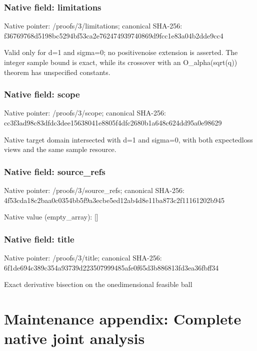 \documentclass[10pt,a4paper]{article}
\begin{document}
\subsubsection{Native field: limitations}


Native pointer: /proofs/3/limitations; canonical SHA-256: f36769768d5198bc5294bf53\allowbreak{}ca2e762474939740869d9fcc\allowbreak{}1e83a04b2dde9cc4


Valid only for d=1 and sigma=0; no positivenoise extension is asserted. The integer sample bound is exact, while its crossover with an O\_alpha(sqrt(q)) theorem has unspecified constants.


\subsubsection{Native field: scope}


Native pointer: /proofs/3/scope; canonical SHA-256: cc3f3ad98c83dfdc3dee1563\allowbreak{}8041e8805f4dfc2680b1a648\allowbreak{}c624dd95a0e98629


Native target domain intersected with d=1 and sigma=0, with both expectedloss views and the same sample resource.


\subsubsection{Native field: source\_refs}


Native pointer: /proofs/3/source\_refs; canonical SHA-256: 4f53cda18c2baa0c0354bb5f\allowbreak{}9a3ecbe5ed12ab4d8e11ba87\allowbreak{}3c2f11161202b945



Native value (empty\_array): []



\subsubsection{Native field: title}


Native pointer: /proofs/3/title; canonical SHA-256: 6f1de694c389c354a93739d2\allowbreak{}23507999485afe0f65d3b886\allowbreak{}813fd3ea36fbff34


Exact derivative bisection on the onedimensional feasible ball


\section{Maintenance appendix: Complete native joint analysis}
\end{document}
